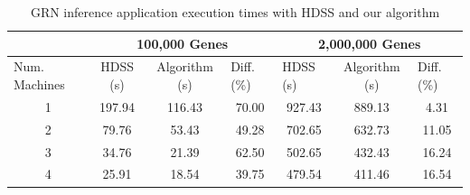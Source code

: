 \documentclass[journal]{IEEEtran}
\begin{document}
\begin{table}[htb]
\centering
\caption{GRN inference application execution times with HDSS and our algorithm}
\begin{scriptsize}
\begin{tabular}{c|c|c|c|c|c|c|}
\cline{2-7}
\multicolumn{1}{l|}{}                 & \multicolumn{3}{c|}{100,000 Genes}                              & \multicolumn{3}{c|}{2,000,000 Genes}                                                  \\ \hline
\multicolumn{1}{|l|}{Num. Machines} & HDSS (s) & Algorithm (s) & \multicolumn{1}{l|}{Diff. (\%)} & \multicolumn{1}{l|}{HDSS (s)} & Algorithm (s) & \multicolumn{1}{l|}{Diff. (\%)} \\ \hline
\multicolumn{1}{|c|}{1 }       &197.94     & 116.43              & 70.00                         & 927.43                         & 889.13              &           4.31                 \\ \hline
\multicolumn{1}{|c|}{2 }      & 79.76     & 53.43              & 49.28                            & 702.65                          & 632.73              & 11.05                           \\ \hline
\multicolumn{1}{|c|}{3 }      & 34.76     & 21.39              & 62.50                            & 502.65                          & 432.43             &               16.24                  \\ \hline
\multicolumn{1}{|c|}{4 }      & 25.91     & 18.54              & 39.75                            & 479.54                          & 411.46             &               16.54  \\ \hline
\end{tabular}
\end{scriptsize}
\label{table: gene}
\end{table}
\end{document}
